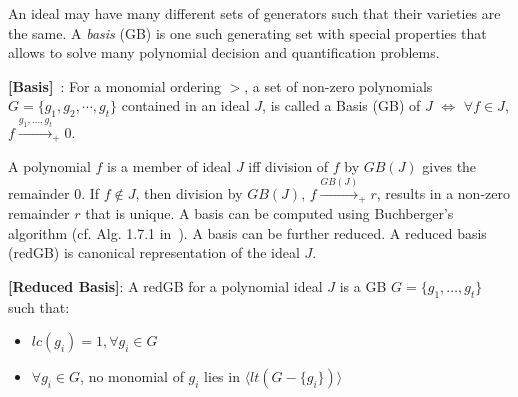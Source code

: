 An ideal may have many different sets of generators such that
their varieties are the same. A {\it \Grobner basis} (GB) is
one such generating set with special properties that allows 
to solve many polynomial decision and quantification problems. 
\begin{Definition}
\label{def:gb}
{\bf [\Grobner Basis]}~\cite{gb_book}: 
For a monomial ordering $>$, a set of non-zero polynomials $G =
\{g_1,g_2,\cdots,g_t\}$ contained in an ideal $J$, is called a
\Grobner Basis (GB) of $J$ $\iff$
$\forall f \in J$, $f\xrightarrow{g_1,\dots,g_t}_+0$. 
\end{Definition}
A polynomial $f$ is a member of ideal $J$ iff division of $f$ by
$GB(J)$ gives the remainder 0. If $f \notin J$,
then division by $GB(J)$, $f\xrightarrow{GB(J)}_+r$, results in a
non-zero remainder $r$ that is unique.
A \Grobner basis can be computed using Buchberger's 
algorithm (cf. Alg. 1.7.1 in~\cite{gb_book}). 
A \Grobner basis can be further reduced. A reduced \Grobner basis
(redGB) is canonical representation of the ideal $J$.

\begin{Definition} \label{def:rgb}
{\bf [Reduced \Grobner Basis]}:
    A redGB for a polynomial ideal $J$ is 
    a GB $G=\{g_{1},\dots,g_{t}\}$ such that:
    \begin{itemize}
        \item $lc(g_{i})=1,\forall g_{i}\in G$
        \item $\forall g_{i} \in G$, no monomial of $g_{i}$ 
        lies in $\langle lt(G-\{g_{i}\})\rangle$
    \end{itemize}
\end{Definition}


